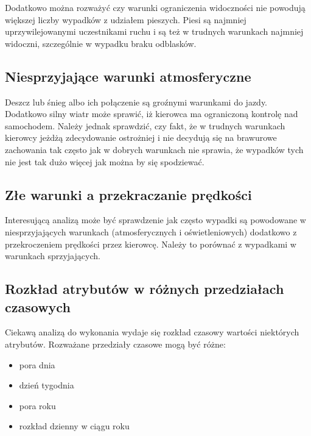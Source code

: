 Dodatkowo można rozważyć czy warunki ograniczenia widoczności nie
powodują większej liczby wypadków z udziałem pieszych. Piesi są najmniej
uprzywilejowanymi uczestnikami ruchu i są też w trudnych warunkach
najmniej widoczni, szczególnie w wypadku braku odblasków.

\subsection{Niesprzyjające warunki
atmosferyczne}\label{niesprzyjajace-warunki-atmosferyczne}

Deszcz lub śnieg albo ich połączenie są groźnymi warunkami do jazdy.
Dodatkowo silny wiatr może sprawić, iż kierowca ma ograniczoną kontrolę
nad samochodem. Należy jednak sprawdzić, czy fakt, że w trudnych
warunkach kierowcy jeżdżą zdecydowanie ostrożniej i nie decydują się na
brawurowe zachowania tak często jak w dobrych warunkach nie sprawia, że
wypadków tych nie jest tak dużo więcej jak można by się spodziewać.

\subsection{Złe warunki a przekraczanie
prędkości}\label{ze-warunki-a-przekraczanie-predkosci}

Interesującą analizą może być sprawdzenie jak często wypadki są
powodowane w niesprzyjających warunkach (atmosferycznych i
oświetleniowych) dodatkowo z przekroczeniem prędkości przez kierowcę.
Należy to porównać z wypadkami w warunkach sprzyjających.

\subsection{Rozkład atrybutów w różnych przedziałach
czasowych}\label{rozkad-atrybutow-w-roznych-przedziaach-czasowych}

Ciekawą analizą do wykonania wydaje się rozkład czasowy wartości
niektórych atrybutów. Rozważane przedziały czasowe mogą być różne:

\begin{itemize}
\itemsep1pt\parskip0pt
\item
  pora dnia\\
\item
  dzień tygodnia\\
\item
  pora roku\\
\item
  rozkład dzienny w ciągu roku
\end{itemize}

